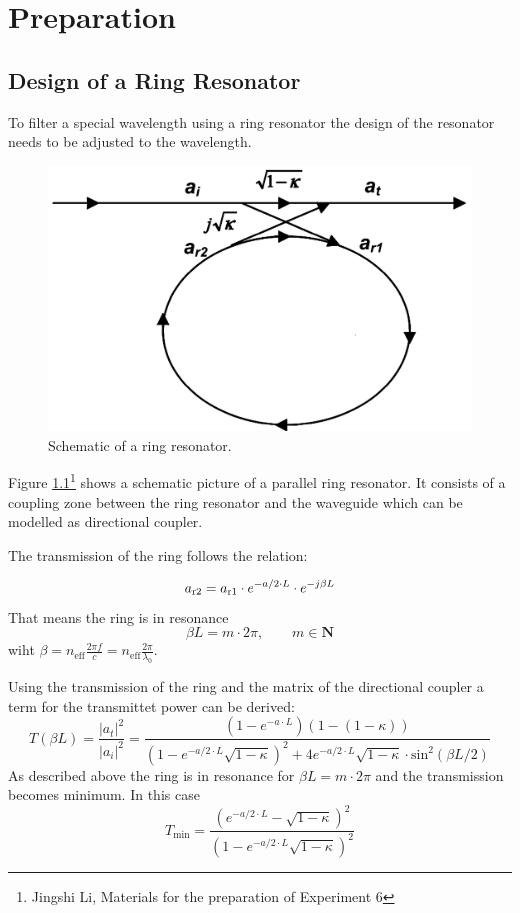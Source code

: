 \chapter{Preparation}


\section{Design of a Ring Resonator}
To filter a special wavelength using a ring resonator the design of the resonator needs to be adjusted to the wavelength.
\begin{figure}[h]%
\centering
\includegraphics[width=.5\columnwidth]{Grafiken/Resonator.png}%
\caption{Schematic of a ring resonator.}%
\label{fig:p1_ring}%
\end{figure} 
Figure \ref{fig:p1_ring}\footnote[1]{Jingshi Li, Materials for the preparation of Experiment 6} shows a schematic picture of a parallel ring resonator. It consists of a coupling zone between the ring resonator and the waveguide which can be modelled as directional coupler\footnotemark[1].

The transmission of the ring follows the relation:

\begin{equation}
a_{\mathrm{r2}}=a_{\mathrm{r1}}\cdot e^{-a/2\cdot L}\cdot e^{-j\beta L}
\label{eq:}
\end{equation}
That means the ring is in resonance
\begin{equation}
\beta L = m\cdot2\pi,\qquad m \in \mathbf{N}
\label{eq:}
\end{equation}
wiht $\beta = n_{\mathrm{eff}} \frac{2\pi f}{c} = n_{\mathrm{eff}} \frac{2\pi}{\lambda_0}$.

Using the transmission of the ring and the matrix of the directional coupler a term for the transmittet power can be derived\footnotemark[1]:
\begin{equation}
T(\beta L) = \frac{|a_t|^2}{|a_i|^2}= \frac{(1-e^{-a\cdot L})(1-(1-\kappa))}{(1-e^{-a/2\cdot L}\sqrt{1-\kappa})^2+4e^{-a/2\cdot L}\sqrt{1-\kappa}\cdot\mathrm{sin}^2(\beta L / 2)}
\label{eq:}
\end{equation}
As described above the ring is in resonance for $\beta L = m\cdot2\pi$ and the transmission becomes minimum. 
In this case
\begin{equation}
T_{\mathrm{min}}=\frac{(e^{-a/2\cdot L} - \sqrt{1-\kappa})^2}{(1 - e^{-a/2\cdot L}\sqrt{1-\kappa})^2}
\label{eq:}
\end{equation}

